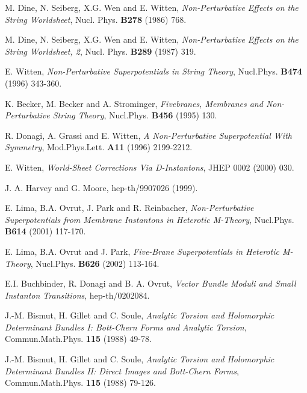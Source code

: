 \documentclass[a4paper,12pt]{article}
\numberwithin{equation}{section}
\theoremstyle{plain}
\begin{document}


\begin{thebibliography}{99}


 M. Dine, N. Seiberg, X.G. Wen and E. Witten, {\em
Non-Perturbative Effects on the String Worldsheet}, Nucl. Phys. {\bf B278}
(1986) 768.

 M. Dine, N. Seiberg, X.G. Wen and E. Witten, {\em
Non-Perturbative Effects on the String Worldsheet, 2}, Nucl. Phys. {\bf
B289}
(1987) 319.

 E. Witten, {\em Non-Perturbative Superpotentials in
String
Theory}, Nucl.Phys. {\bf B474} (1996) 343-360.

  K. Becker, M. Becker and A. Strominger, {\em
Fivebranes, Membranes and Non-Perturbative String Theory},
Nucl.Phys. {\bf B456} (1995) 130.

 R. Donagi, A. Grassi and E. Witten, {\em A Non-Perturbative
Superpotential With \coordHE{} Symmetry}, Mod.Phys.Lett. {\bf A11} (1996)
2199-2212.

 E. Witten, {\em World-Sheet Corrections Via
D-Instantons},
JHEP 0002 (2000) 030.

 J. A. Harvey and  G. Moore, hep-th/9907026 (1999).

 E. Lima, B.A. Ovrut, J. Park and R. Reinbacher,
{\em Non-Perturbative Superpotentials from Membrane Instantons in
Heterotic M-Theory}, Nucl.Phys. {\bf B614} (2001) 117-170.

 E. Lima, B.A. Ovrut and J. Park,
{\em  Five-Brane Superpotentials in Heterotic M-Theory},
Nucl.Phys. {\bf B626} (2002) 113-164.

  E.I. Buchbinder, R. Donagi and B. A. Ovrut,
{\em Vector Bundle Moduli and Small Instanton Transitions},
hep-th/0202084.

 J.-M. Bismut, H. Gillet and C. Soule,
{\em Analytic Torsion and Holomorphic Determinant Bundles I: Bott-Chern
Forms and Analytic Torsion}, Commun.Math.Phys. {\bf
115 \rm} (1988) 49-78.

 J.-M. Bismut, H. Gillet and C. Soule,
{\em Analytic Torsion and Holomorphic Determinant Bundles II: Direct Images
and Bott-Chern Forms}, Commun.Math.Phys. {\bf
115 \rm} (1988) 79-126.


\end{thebibliography}
\end{document}
